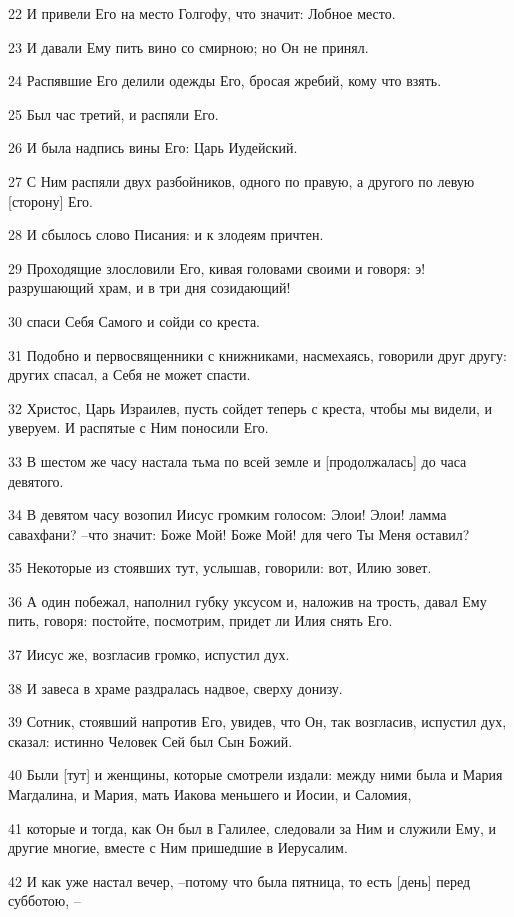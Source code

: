 \par 22 И привели Его на место Голгофу, что значит: Лобное место.
\par 23 И давали Ему пить вино со смирною; но Он не принял.
\par 24 Распявшие Его делили одежды Его, бросая жребий, кому что взять.
\par 25 Был час третий, и распяли Его.
\par 26 И была надпись вины Его: Царь Иудейский.
\par 27 С Ним распяли двух разбойников, одного по правую, а другого по левую [сторону] Его.
\par 28 И сбылось слово Писания: и к злодеям причтен.
\par 29 Проходящие злословили Его, кивая головами своими и говоря: э! разрушающий храм, и в три дня созидающий!
\par 30 спаси Себя Самого и сойди со креста.
\par 31 Подобно и первосвященники с книжниками, насмехаясь, говорили друг другу: других спасал, а Себя не может спасти.
\par 32 Христос, Царь Израилев, пусть сойдет теперь с креста, чтобы мы видели, и уверуем. И распятые с Ним поносили Его.
\par 33 В шестом же часу настала тьма по всей земле и [продолжалась] до часа девятого.
\par 34 В девятом часу возопил Иисус громким голосом: Элои! Элои! ламма савахфани? --что значит: Боже Мой! Боже Мой! для чего Ты Меня оставил?
\par 35 Некоторые из стоявших тут, услышав, говорили: вот, Илию зовет.
\par 36 А один побежал, наполнил губку уксусом и, наложив на трость, давал Ему пить, говоря: постойте, посмотрим, придет ли Илия снять Его.
\par 37 Иисус же, возгласив громко, испустил дух.
\par 38 И завеса в храме раздралась надвое, сверху донизу.
\par 39 Сотник, стоявший напротив Его, увидев, что Он, так возгласив, испустил дух, сказал: истинно Человек Сей был Сын Божий.
\par 40 Были [тут] и женщины, которые смотрели издали: между ними была и Мария Магдалина, и Мария, мать Иакова меньшего и Иосии, и Саломия,
\par 41 которые и тогда, как Он был в Галилее, следовали за Ним и служили Ему, и другие многие, вместе с Ним пришедшие в Иерусалим.
\par 42 И как уже настал вечер, --потому что была пятница, то есть [день] перед субботою, --
